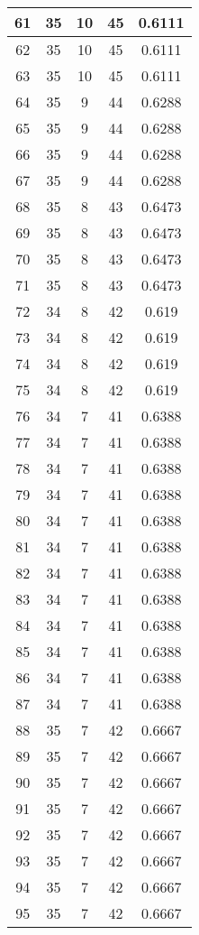 \documentclass[letterpaper, 12pt]{article}
\begin{document}
\begin{longtable}{|c|c|c|c|c|}
\hline
61 & 35 & 10 & 45 & 0.6111 \\
\hline
62 & 35 & 10 & 45 & 0.6111 \\
\hline
63 & 35 & 10 & 45 & 0.6111 \\
\hline
64 & 35 & 9 & 44 & 0.6288 \\
\hline
65 & 35 & 9 & 44 & 0.6288 \\
\hline
66 & 35 & 9 & 44 & 0.6288 \\
\hline
67 & 35 & 9 & 44 & 0.6288 \\
\hline
68 & 35 & 8 & 43 & 0.6473 \\
\hline
69 & 35 & 8 & 43 & 0.6473 \\
\hline
70 & 35 & 8 & 43 & 0.6473 \\
\hline
71 & 35 & 8 & 43 & 0.6473 \\
\hline
72 & 34 & 8 & 42 & 0.619 \\
\hline
73 & 34 & 8 & 42 & 0.619 \\
\hline
74 & 34 & 8 & 42 & 0.619 \\
\hline
75 & 34 & 8 & 42 & 0.619 \\
\hline
76 & 34 & 7 & 41 & 0.6388 \\
\hline
77 & 34 & 7 & 41 & 0.6388 \\
\hline
78 & 34 & 7 & 41 & 0.6388 \\
\hline
79 & 34 & 7 & 41 & 0.6388 \\
\hline
80 & 34 & 7 & 41 & 0.6388 \\
\hline
81 & 34 & 7 & 41 & 0.6388 \\
\hline
82 & 34 & 7 & 41 & 0.6388 \\
\hline
83 & 34 & 7 & 41 & 0.6388 \\
\hline
84 & 34 & 7 & 41 & 0.6388 \\
\hline
85 & 34 & 7 & 41 & 0.6388 \\
\hline
86 & 34 & 7 & 41 & 0.6388 \\
\hline
87 & 34 & 7 & 41 & 0.6388 \\
\hline
88 & 35 & 7 & 42 & 0.6667 \\
\hline
89 & 35 & 7 & 42 & 0.6667 \\
\hline
90 & 35 & 7 & 42 & 0.6667 \\
\hline
91 & 35 & 7 & 42 & 0.6667 \\
\hline
92 & 35 & 7 & 42 & 0.6667 \\
\hline
93 & 35 & 7 & 42 & 0.6667 \\
\hline
94 & 35 & 7 & 42 & 0.6667 \\
\hline
95 & 35 & 7 & 42 & 0.6667 \\

\end{longtable}
\end{document}
